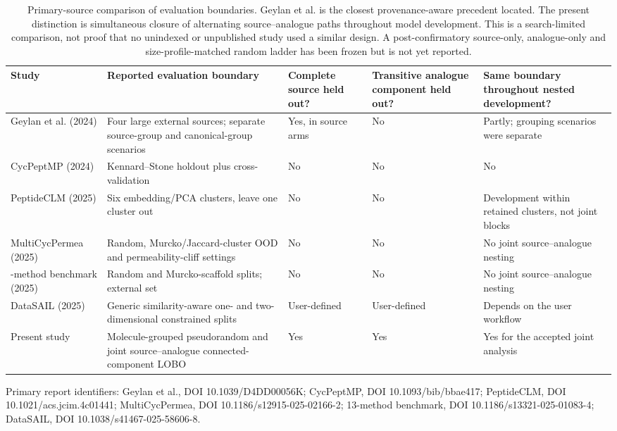 \documentclass[10pt]{article}
\begin{document}
\begin{table}[htbp]
\centering
\caption{Primary-source comparison of evaluation boundaries. Geylan et al. is the closest provenance-aware precedent located. The present distinction is simultaneous closure of alternating source--analogue paths throughout model development. This is a search-limited comparison, not proof that no unindexed or unpublished study used a similar design. A post-confirmatory source-only, analogue-only and size-profile-matched random ladder has been frozen but is not yet reported.}
\scriptsize
\setlength{\tabcolsep}{3pt}
\renewcommand{\arraystretch}{1.15}
\begin{tabularx}{\textwidth}{>{\raggedright\arraybackslash}p{}>{\raggedright\arraybackslash}X>{\centering\arraybackslash}p{}>{\centering\arraybackslash}p{}>{\raggedright\arraybackslash}p{}}
\toprule
\textbf{Study} & \textbf{Reported evaluation boundary} & \textbf{Complete source held out?} & \textbf{Transitive analogue component held out?} & \textbf{Same boundary throughout nested development?} \\
\midrule
Geylan et al. (2024) & Four large external sources; separate source-group and canonical-group scenarios & Yes, in source arms & No & Partly; grouping scenarios were separate \\
CycPeptMP (2024) & Kennard--Stone holdout plus cross-validation & No & No & No \\
PeptideCLM (2025) & Six embedding/PCA clusters, leave one cluster out & No & No & Development within retained clusters, not joint blocks \\
MultiCycPermea (2025) & Random, Murcko/Jaccard-cluster OOD and permeability-cliff settings & No & No & No joint source--analogue nesting \\
13-method benchmark (2025) & Random and Murcko-scaffold splits; external set & No & No & No joint source--analogue nesting \\
DataSAIL (2025) & Generic similarity-aware one- and two-dimensional constrained splits & User-defined & User-defined & Depends on the user workflow \\
Present study & Molecule-grouped pseudorandom and joint source--analogue connected-component LOBO & Yes & Yes & Yes for the accepted joint analysis \\
\bottomrule
\end{tabularx}
\end{table}

Primary report identifiers: Geylan et al., DOI 10.1039/D4DD00056K; CycPeptMP, DOI 10.1093/bib/bbae417; PeptideCLM, DOI 10.1021/acs.jcim.4c01441; MultiCycPermea, DOI 10.1186/s12915-025-02166-2; 13-method benchmark, DOI 10.1186/s13321-025-01083-4; DataSAIL, DOI 10.1038/s41467-025-58606-8.
\end{document}
